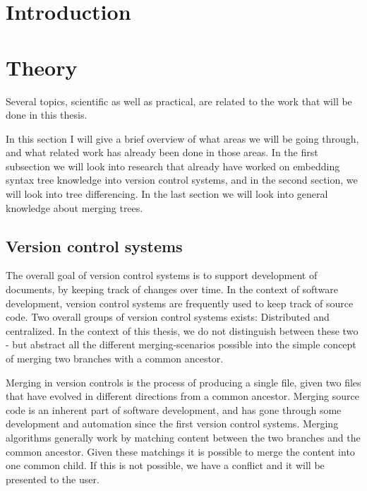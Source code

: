 \documentclass[11pt]{article}
\author{
        Kasper Videbæk \\
}
\date{\today}
\begin{document}
\maketitle

\tableofcontents

\clearpage 
\section{Introduction}

\clearpage 
\section{Theory}
Several topics, scientific as well as practical, are related to the work that will be done in this thesis.

In this section I will give a brief overview of what areas we will be going through, and what related work has already been done in those areas. In the first subsection we will look into research that already have worked on embedding syntax tree knowledge into version control systems, and in the second section, we will look into tree differencing. In the last section we will look into general knowledge about merging trees.

\subsection{Version control systems}
The overall goal of version control systems is to support development of documents, by keeping track of changes over time. In the context of software development, version control systems are frequently used to keep track of source code. Two overall groups of version control systems exists: Distributed and centralized. In the context of this thesis, we do not distinguish between these two - but abstract all the different merging-scenarios possible into the simple concept of merging two branches with a common ancestor.

Merging in version controls is the process of producing a single file, given two files that have evolved in different directions from a common ancestor. Merging source code is an inherent part of software development, and has gone through some development and automation since the first version control systems. Merging algorithms generally work by matching content between the two branches and the common ancestor. Given these matchings it is possible to merge the content into one common child. If this is not possible, we have a conflict and it will be presented to the user.
\end{document}
